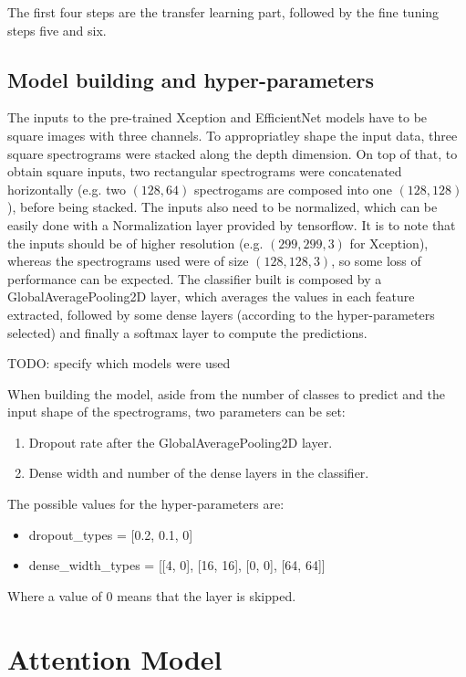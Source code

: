 The first four steps are the transfer learning part, followed by the fine
tuning steps five and six.

\subsection{Model building and hyper-parameters}

The inputs to the pre-trained Xception and EfficientNet models have to be
square images with three channels.
To appropriatley shape the input data, three square spectrograms were stacked
along the depth dimension.
On top of that, to obtain square inputs, two rectangular spectrograms were
concatenated horizontally (e.g. two $\left( 128, 64 \right)$ spectrogams are
composed into one $\left( 128, 128 \right)$), before being stacked.
The inputs also need to be normalized, which can be easily done with a
Normalization layer provided by tensorflow.
It is to note that the inputs should be of higher resolution (e.g. $\left( 299,
299, 3 \right)$ for Xception), whereas the spectrograms used were of size
$\left( 128, 128, 3 \right)$, so some loss of performance can be expected.
The classifier built is composed by a GlobalAveragePooling2D layer, which
averages the values in each feature extracted, followed by some dense layers
(according to the hyper-parameters selected) and finally a softmax layer to
compute the predictions.

TODO: specify which models were used

When building the model, aside from the number of classes to predict and the
input shape of the spectrograms, two parameters can be set:
\begin{enumerate}
    \item Dropout rate after the GlobalAveragePooling2D layer.
    \item Dense width and number of the dense layers in the classifier.
\end{enumerate}
The possible values for the hyper-parameters are:
\begin{itemize}
    \item dropout\_types = [0.2, 0.1, 0]
    \item dense\_width\_types = [[4, 0], [16, 16], [0, 0], [64, 64]]
\end{itemize}
Where a value of $0$ means that the layer is skipped.

\section{Attention Model}
\label{sec:attention_model}

